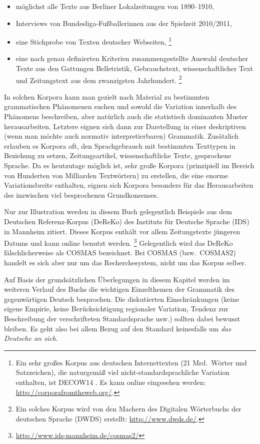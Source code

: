 \begin{itemize}\Lf
  \item möglichst alle Texte aus Berliner Lokalzeitungen von 1890--1910,
  \item Interviews von Bundesliga-Fußballerinnen aus der Spielzeit 2010\slash 2011,
  \item eine Stichprobe von Texten deutscher Webseiten,%
		\footnote{Ein sehr großes Korpus aus deutschen Internettexten (21 Mrd.\ Wörter und Satzzeichen), die naturgemäß viel nicht-standardsprachliche Variation enthalten, ist DECOW14 \citep{SchaeferBildhauer2012a}.
		Es kann online eingesehen werden: \url{http://corporafromtheweb.org/}.}
  \item eine nach genau definierten Kriterien zusammengestellte Auswahl deutscher Texte aus den Gattungen Belletristik, Gebrauchstext, wissenschaftlicher Text und Zeitungstext aus dem zwanzigsten Jahrhundert.%
		\footnote{Ein solches Korpus wird von den Machern des Digitalen Wörterbuchs der deutschen Sprache (DWDS) erstellt: \url{http://www.dwds.de/}.}
\end{itemize}

In solchen Korpora kann man gezielt nach Material zu bestimmten grammatischen Phänomenen suchen und sowohl die Variation innerhalb des Phänomens beschreiben, aber natürlich auch die statistisch dominanten Muster herausarbeiten.
Letztere eignen sich dann zur Darstellung in einer deskriptiven (wenn man möchte auch normativ interpretierbaren) Grammatik.
Zusätzlich erlauben es Korpora oft, den Sprachgebrauch mit bestimmten Texttypen in Beziehung zu setzen, \zB Zeitungsartikel, wissenschaftliche Texte, gesprochene Sprache.
Da es heutzutage möglich ist, sehr große Korpora (prinzipiell im Bereich von Hunderten von Milliarden Textwörtern) zu erstellen, die eine enorme Variationsbreite enthalten, eignen sich Korpora besonders für das Herausarbeiten des inzwischen viel besprochenen Grundkonsenses.

Nur zur Illustration werden in diesem Buch gelegentlich Beispiele aus dem Deutschen Referenz-Korpus (DeReKo) des Instituts für Deutsche Sprache (IDS) in Mannheim zitiert.\label{abs:dereko}
Dieses Korpus enthält vor allem Zeitungstexte jüngeren Datums und kann online benutzt werden.%
\footnote{\url{http://www.ids-mannheim.de/cosmas2/}}
Gelegentlich wird das DeReKo fälschlicherweise als COSMAS bezeichnet.
Bei COSMAS (bzw.\ COSMAS2) handelt es sich aber nur um das Recherchesystem, nicht um das Korpus selber.

Auf Basis der grundsätzlichen Überlegungen in diesem Kapitel werden im weiteren Verlauf des Buchs die wichtigen Einzelthemen der Grammatik des gegenwärtigen Deutsch besprochen.
Die diskutierten Einschränkungen (keine eigene Empirie, keine Berücksichtigung regionaler Variation, Tendenz zur Beschreibung der verschrifteten Standardsprache usw.) sollten dabei bewusst bleiben.
Es geht also bei allem Bezug auf den Standard keinesfalls um \textit{das Deutsche an sich}.

